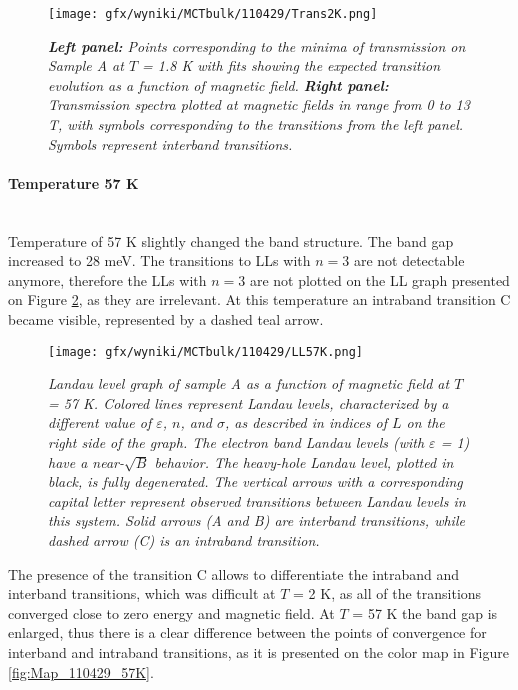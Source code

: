 \documentclass[titlepage,a4paper]{book}
\newcommand{\wciecie}{\quad\phantom{v}}
\newcommand{\myparagraph}[1]{\paragraph{#1}\mbox{}\\}
\begin{document}
\begin{figure}[H]
	\centering
	\texttt{[image: gfx/wyniki/MCTbulk/110429/Trans2K.png]}
	\vspace{-10pt}
	\caption{\textit{\textbf{Left panel:} Points corresponding to the minima of transmission on Sample A at $T$ = 1.8 K with fits showing the expected transition evolution as a function of magnetic field. \textbf{Right panel:} Transmission spectra plotted at magnetic fields in range from 0 to 13 T, with symbols corresponding to the transitions from the left panel. Symbols represent interband transitions.}}
	\label{fig:Spectra_110429_2K}
\end{figure} 


\myparagraph{Temperature 57 K}
\wciecie
Temperature of 57 K slightly changed the band structure. The band gap increased to 28 meV. The transitions to LLs with $n = 3$ are not detectable anymore, therefore the LLs with $n = 3$ are not plotted on the LL graph presented on Figure \ref{fig:LL_110429_57K}, as they are irrelevant. At this temperature an intraband transition C became visible, represented by a dashed teal arrow.

\begin{figure}[ht]
	\centering
	\texttt{[image: gfx/wyniki/MCTbulk/110429/LL57K.png]}
	\vspace{-10pt}
	\caption{\textit{Landau level graph of sample A as a function of magnetic field at $T$ = 57 K. Colored lines represent Landau levels, characterized by a different value of $\varepsilon$, $n$, and $\sigma$, as described in indices of $L$ on the right side of the graph. The electron band Landau levels (with $\varepsilon$ = 1) have a near-$\sqrt{B}$ behavior. The heavy-hole Landau level, plotted in black, is fully degenerated. The vertical arrows with a corresponding capital letter represent observed transitions between Landau levels in this system. Solid arrows (A and B) are interband transitions, while dashed arrow (C) is an intraband transition.}} 
	\label{fig:LL_110429_57K}
\end{figure}

The presence of the transition C allows to differentiate the intraband and interband transitions, which was difficult at $T$ = 2 K, as all of the transitions converged close to zero energy and magnetic field. At $T$ = 57 K the band gap is enlarged, thus there is a clear difference between the points of convergence for interband and intraband transitions, as it is presented on the color map in Figure \ref{fig:Map_110429_57K}.
 
\end{document}
